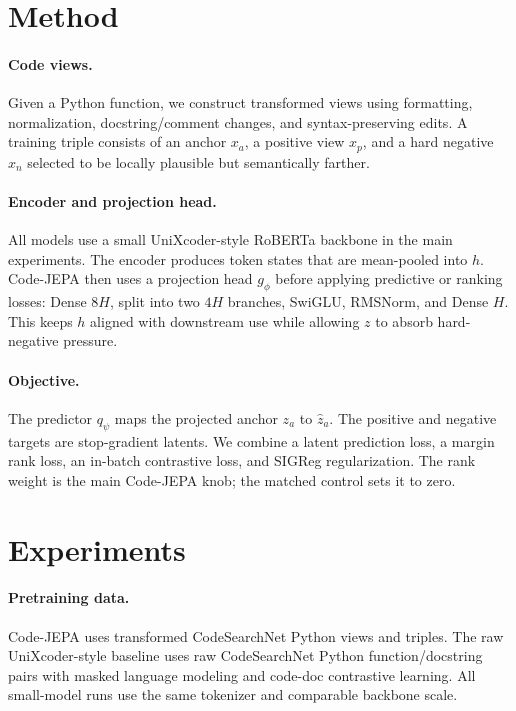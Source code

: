 \documentclass[11pt]{article}
\begin{document}
\section{Method}

\paragraph{Code views.}
Given a Python function, we construct transformed views using formatting,
normalization, docstring/comment changes, and syntax-preserving edits. A training
triple consists of an anchor \(x_a\), a positive view \(x_p\), and a hard
negative \(x_n\) selected to be locally plausible but semantically farther.

\paragraph{Encoder and projection head.}
All models use a small UniXcoder-style RoBERTa backbone in the main experiments.
The encoder produces token states that are mean-pooled into \(h\). Code-JEPA then
uses a projection head \(g_\phi\) before applying predictive or ranking losses:
Dense \(8H\), split into two \(4H\) branches, SwiGLU, RMSNorm, and Dense \(H\).
This keeps \(h\) aligned with downstream use while allowing \(z\) to absorb
hard-negative pressure.

\paragraph{Objective.}
The predictor \(q_\psi\) maps the projected anchor \(z_a\) to \(\hat{z}_a\).
The positive and negative targets are stop-gradient latents. We combine a latent
prediction loss, a margin rank loss, an in-batch contrastive loss, and SIGReg
regularization. The rank weight is the main Code-JEPA knob; the matched control
sets it to zero.

\section{Experiments}

\paragraph{Pretraining data.}
Code-JEPA uses transformed CodeSearchNet Python views and triples. The raw
UniXcoder-style baseline uses raw CodeSearchNet Python function/docstring pairs
with masked language modeling and code-doc contrastive learning. All small-model
runs use the same tokenizer and comparable backbone scale.
\end{document}
